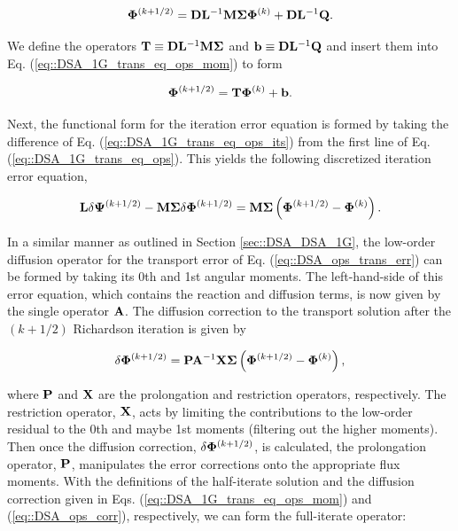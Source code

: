 \begin{equation}
\label{eq::DSA_1G_trans_eq_ops_mom}
 {\bf \Phi}^{(k+1/2)}  =  {\bf D} {\bf L}^{-1} {\bf M} {\bf \Sigma}  {\bf \Phi}^{(k)} +  {\bf D} {\bf L}^{-1}   {\bf Q} .
\end{equation}

\noindent We define the operators ${\bf T} \equiv {\bf D} {\bf L}^{-1} {\bf M} {\bf \Sigma}$ and ${\bf b} \equiv {\bf D} {\bf L}^{-1}   {\bf Q}$ and insert them into Eq. (\ref{eq::DSA_1G_trans_eq_ops_mom}) to form

\begin{equation}
\label{eq::DSA_1G_trans_eq_ops_mom_simple}
 {\bf \Phi}^{(k+1/2)}  = {\bf T}  {\bf \Phi}^{(k)} +  {\bf b} .
\end{equation}

\noindent Next, the functional form for the iteration error equation is formed by taking the difference of Eq. (\ref{eq::DSA_1G_trans_eq_ops_its}) from the first line of Eq. (\ref{eq::DSA_1G_trans_eq_ops}). This yields the following discretized iteration error equation,

\begin{equation}
\label{eq::DSA_ops_trans_err}
{\bf L} \delta {\bf \Psi}^{(k+1/2)} - {\bf M} {\bf \Sigma} \delta {\bf \Phi}^{(k+1/2)}  =   {\bf M} {\bf \Sigma} \left( {\bf \Phi}^{(k+1/2)} - {\bf \Phi}^{(k)}  \right) .
\end{equation}

\noindent In a similar manner as outlined in Section \ref{sec::DSA_DSA_1G}, the low-order diffusion operator for the transport error of Eq. (\ref{eq::DSA_ops_trans_err}) can be formed by taking its 0th and 1st angular moments. The left-hand-side of this error equation, which contains the reaction and diffusion terms, is now given by the single operator ${\bf A}$. The diffusion correction to the transport solution after the $(k+1/2)$ Richardson iteration is given by

\begin{equation}
\label{eq::DSA_ops_corr}
 \delta {\bf \Phi}^{(k+1/2)}  = {\bf P} {\bf A}^{-1} {\bf X} {\bf \Sigma} \left( {\bf \Phi}^{(k+1/2)} - {\bf \Phi}^{(k)}  \right) ,
\end{equation}

\noindent where ${\bf P}$ and ${\bf X}$ are the prolongation and restriction operators, respectively. The restriction operator, ${\bf X}$, acts by limiting the contributions to the low-order residual to the 0th and maybe 1st moments (filtering out the higher moments). Then once the diffusion correction, $\delta {\bf \Phi}^{(k+1/2)}$, is calculated, the prolongation operator, ${\bf P}$, manipulates the error corrections onto the appropriate flux moments. With the definitions of the half-iterate solution and the diffusion correction given in Eqs. (\ref{eq::DSA_1G_trans_eq_ops_mom}) and (\ref{eq::DSA_ops_corr}), respectively, we can form the full-iterate operator:

